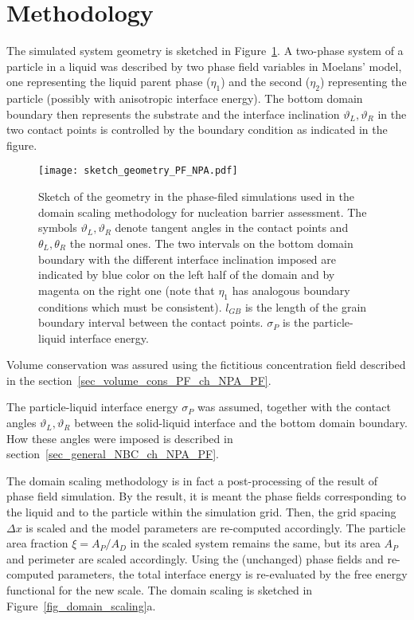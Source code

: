 \section{Methodology}
The simulated system geometry is sketched in Figure~\ref{fig_sketch_domain_scaling_PF}. A two-phase system of a particle in a liquid was described by two phase field variables in Moelans' model, one representing the liquid parent phase ($\eta_1$) and the second ($\eta_2$) representing the particle (possibly with anisotropic interface energy). The bottom domain boundary then represents the substrate and the interface inclination $\vartheta_L,\vartheta_R$ in the two contact points is controlled by the boundary condition as indicated in the figure.
\begin{figure}
	\centering
	\texttt{[image: sketch\_geometry\_PF\_NPA.pdf]}
	\caption{Sketch of the geometry in the phase-filed simulations used in the domain scaling methodology for nucleation barrier assessment. The symbols $\vartheta_L,\vartheta_R$ denote tangent angles in the contact points and $\theta_L,\theta_R$ the normal ones. The two intervals on the bottom domain boundary with the different interface inclination imposed are indicated  by blue color on the left half of the domain and by magenta on the right one (note that $\eta_1$ has analogous boundary conditions which must be consistent). $l_{GB}$ is the length of the grain boundary interval between the contact points. $\sigma_P$ is the particle-liquid interface energy.}
	\label{fig_sketch_domain_scaling_PF}
\end{figure}

Volume conservation was assured using the fictitious concentration field described in the section~\ref{sec_volume_cons_PF_ch_NPA_PF}. 

The particle-liquid interface energy $\sigma_P$ was assumed, together with the contact angles $\vartheta_L, \vartheta_R$ between the solid-liquid interface and the bottom domain boundary. How these angles were imposed is described in section~\ref{sec_general_NBC_ch_NPA_PF}.

The domain scaling methodology is in fact a post-processing of the result of phase field simulation. By the result, it is meant the phase fields corresponding to the liquid and to the particle within the simulation grid. Then, the grid spacing $\Delta x$ is scaled and the model parameters are re-computed accordingly. The particle area fraction $\xi=A_P/A_D$ in the scaled system remains the same, but its area $A_P$ and perimeter are scaled accordingly. Using the (unchanged) phase fields and re-computed parameters, the total interface energy is re-evaluated by the free energy functional for the new scale. The domain scaling is sketched in Figure~\ref{fig_domain_scaling}a. 

